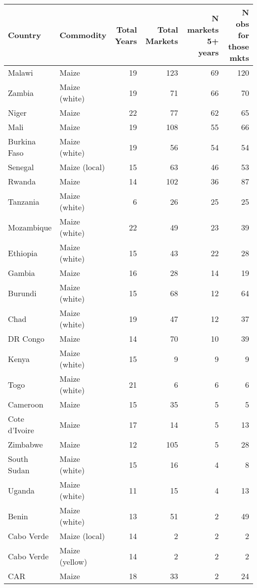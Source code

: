 \begin{table}[ht]
\centering
\begin{tabular}{llrrrr}
  \hline
Country & Commodity & Total Years & Total Markets & N markets 5+ years & N obs for those mkts \\ 
  \hline
Malawi & Maize &  19 & 123 &  69 & 120 \\ 
  Zambia & Maize (white) &  19 &  71 &  66 &  70 \\ 
  Niger & Maize &  22 &  77 &  62 &  65 \\ 
  Mali & Maize &  19 & 108 &  55 &  66 \\ 
  Burkina Faso & Maize (white) &  19 &  56 &  54 &  54 \\ 
  Senegal & Maize (local) &  15 &  63 &  46 &  53 \\ 
  Rwanda & Maize &  14 & 102 &  36 &  87 \\ 
  Tanzania & Maize (white) &   6 &  26 &  25 &  25 \\ 
  Mozambique & Maize (white) &  22 &  49 &  23 &  39 \\ 
  Ethiopia & Maize (white) &  15 &  43 &  22 &  28 \\ 
  Gambia & Maize &  16 &  28 &  14 &  19 \\ 
  Burundi & Maize (white) &  15 &  68 &  12 &  64 \\ 
  Chad & Maize (white) &  19 &  47 &  12 &  37 \\ 
  DR Congo & Maize &  14 &  70 &  10 &  39 \\ 
  Kenya & Maize (white) &  15 &   9 &   9 &   9 \\ 
  Togo & Maize (white) &  21 &   6 &   6 &   6 \\ 
  Cameroon & Maize &  15 &  35 &   5 &   5 \\ 
  Cote d'Ivoire & Maize &  17 &  14 &   5 &  13 \\ 
  Zimbabwe & Maize &  12 & 105 &   5 &  28 \\ 
  South Sudan & Maize (white) &  15 &  16 &   4 &   8 \\ 
  Uganda & Maize (white) &  11 &  15 &   4 &  13 \\ 
  Benin & Maize (white) &  13 &  51 &   2 &  49 \\ 
  Cabo Verde & Maize (local) &  14 &   2 &   2 &   2 \\ 
  Cabo Verde & Maize (yellow) &  14 &   2 &   2 &   2 \\ 
  CAR & Maize &  18 &  33 &   2 &  24 \\ 

\end{tabular}
\end{table}
